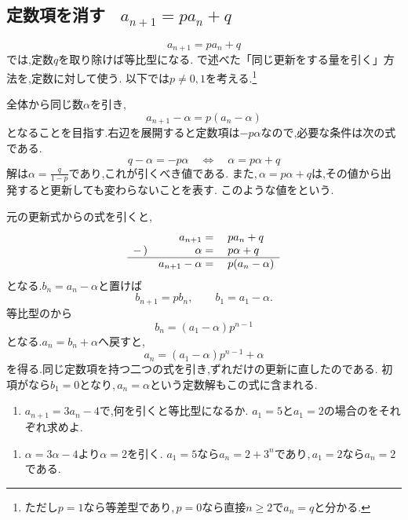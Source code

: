 
\subsection{\texorpdfstring{定数項を消す \, $a_{n+1}=pa_n+q$}{定数項を消す}}\label{節：特性方程式型}
  \[
    a_{n+1}=pa_n+q
  \]
  では,定数$q$を取り除けば等比型になる.
  で述べた「同じ更新をする量を引く」方法を,定数に対して使う.
  以下では$p\ne0,1$を考える.\footnote{ただし$p=1$なら等差型であり,\,$p=0$なら直接$n\ge2$で$a_n=q$と分かる.}

  全体から同じ数$\alpha$を引き,
  \[
    a_{n+1}-\alpha=p(a_n-\alpha)
  \]
  となることを目指す.右辺を展開すると定数項は$-p\alpha$なので,必要な条件は次の式である.
  \[
    q-\alpha=-p\alpha
    \quad\Longleftrightarrow\quad
    \alpha=p\alpha+q
  \]
  解は$\alpha=\frac{q}{1-p}$であり,これが引くべき値である.
  また,\,$\alpha=p\alpha+q$は,その値から出発すると更新しても変わらないことを表す.
  このような値をという.

  元の更新式からの式を引くと,
  \[
    \begin{array}{rrl}
       &a_{n+1}={}&pa_n+q\\
      -\,)&\alpha={}&p\alpha+q\\ \hline
       &a_{n+1}-\alpha={}&p(a_n-\alpha)
    \end{array}
  \]
  となる.$b_n=a_n-\alpha$と置けば
  \[
    b_{n+1}=pb_n,\qquad b_1=a_1-\alpha.
  \]
  等比型のから
  \[
    b_n=(a_1-\alpha)p^{n-1}
  \]
  となる.$a_n=b_n+\alpha$へ戻すと,
  \[
    a_n=(a_1-\alpha)p^{n-1}+\alpha
  \]
  を得る.同じ定数項を持つ二つの式を引き,ずれだけの更新に直したのである.
  初項がなら$b_1=0$となり,\,$a_n=\alpha$という定数解もこの式に含まれる.

  \noindent{}\par\nobreak
  \begin{enumerate}[format=\bookitemlink{check-fixed}{problem}{answer}]
    \item $a_{n+1}=3a_n-4$で,何を引くと等比型になるか.
          $a_1=5$と$a_1=2$の場合のをそれぞれ求めよ.
  \end{enumerate}
  \noindent{}\par\nobreak
  \begin{enumerate}[format=\bookitemlink{check-fixed}{answer}{problem}]
    \item $\alpha=3\alpha-4$より$\alpha=2$を引く.
          $a_1=5$なら$a_n=2+3^n$であり,\,$a_1=2$なら$a_n=2$である.
  \end{enumerate}

